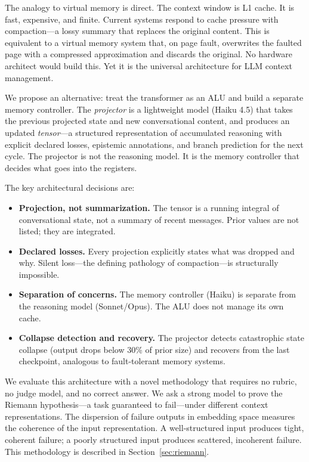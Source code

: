 \documentclass[11pt]{article}
\begin{document}
The analogy to virtual memory is direct. The context window is L1
cache. It is fast, expensive, and finite. Current systems respond to
cache pressure with compaction---a lossy summary that replaces the
original content. This is equivalent to a virtual memory system that,
on page fault, overwrites the faulted page with a compressed
approximation and discards the original. No hardware architect would
build this. Yet it is the universal architecture for LLM context
management.

We propose an alternative: treat the transformer as an ALU and build a
separate memory controller. The \emph{projector} is a lightweight model
(Haiku 4.5) that takes the previous projected state and new
conversational content, and produces an updated \emph{tensor}---a
structured representation of accumulated reasoning with explicit
declared losses, epistemic annotations, and branch prediction for the
next cycle. The projector is not the reasoning model. It is the memory
controller that decides what goes into the registers.

The key architectural decisions are:
\begin{itemize}
\item \textbf{Projection, not summarization.} The tensor is a running
  integral of conversational state, not a summary of recent messages.
  Prior values are not listed; they are integrated.
\item \textbf{Declared losses.} Every projection explicitly states what
  was dropped and why. Silent loss---the defining pathology of
  compaction---is structurally impossible.
\item \textbf{Separation of concerns.} The memory controller (Haiku) is
  separate from the reasoning model (Sonnet/Opus). The ALU does not
  manage its own cache.
\item \textbf{Collapse detection and recovery.} The projector detects
  catastrophic state collapse (output drops below 30\% of prior size)
  and recovers from the last checkpoint, analogous to
  fault-tolerant memory systems.
\end{itemize}

We evaluate this architecture with a novel methodology that requires no
rubric, no judge model, and no correct answer. We ask a strong model to
prove the Riemann hypothesis---a task guaranteed to fail---under
different context representations. The dispersion of failure outputs in
embedding space measures the coherence of the input representation. A
well-structured input produces tight, coherent failure; a poorly
structured input produces scattered, incoherent failure. This
methodology is described in Section~\ref{sec:riemann}.
\end{document}
